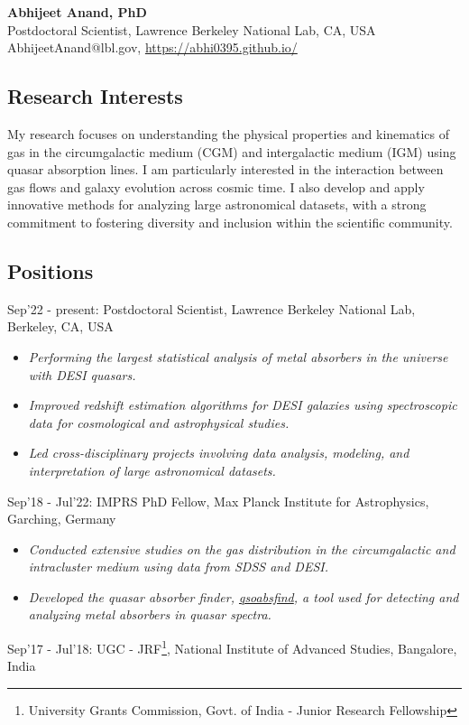 \documentclass[12pt,letterpaper]{article}
\begin{document}
\thispagestyle{empty}\sloppy\sloppypar\raggedbottom

\textbf{\Large Abhijeet Anand, PhD}\\[0.5ex]
Postdoctoral Scientist, Lawrence Berkeley National Lab, CA, USA\\[0.5ex]
\textsf{\small AbhijeetAnand@lbl.gov, \href{https://abhi0395.github.io/}{https://abhi0395.github.io/}}\\[0.5ex]

\subsection{Research Interests}
My research focuses on understanding the physical properties and kinematics of gas in the circumgalactic medium (CGM) and intergalactic medium (IGM) using quasar absorption lines. I am particularly interested in the interaction between gas flows and galaxy evolution across cosmic time. I also develop and apply innovative methods for analyzing large astronomical datasets, with a strong commitment to fostering diversity and inclusion within the scientific community.

\subsection{Positions}
\begin{list}{}{\cvlist}
\item Sep'22 - present: Postdoctoral Scientist, Lawrence Berkeley National Lab, Berkeley, CA, USA \\
\begin{itemize}
  \item \emph{Performing the largest statistical analysis of metal absorbers in the universe with DESI quasars.}
  \item \emph{Improved redshift estimation algorithms for DESI galaxies using spectroscopic data for cosmological and astrophysical studies.}
  \item \emph{Led cross-disciplinary projects involving data analysis, modeling, and interpretation of large astronomical datasets.}
\end{itemize}
\item Sep'18 - Jul'22: IMPRS PhD Fellow, Max Planck Institute for Astrophysics, Garching, Germany
\begin{itemize}
\item \emph{Conducted extensive studies on the gas distribution in the circumgalactic and intracluster medium using data from SDSS and DESI.}
\item \emph{Developed the quasar absorber finder, \href{https://github.com/abhi0395/qsoabsfind}{qsoabsfind}, a tool used for detecting and analyzing metal absorbers in quasar spectra.}
\end{itemize}
\item Sep'17 - Jul'18: UGC - JRF\footnote{University Grants Commission, Govt. of India - Junior Research Fellowship}, National Institute of Advanced Studies, Bangalore, India
\end{list}
\end{document}
